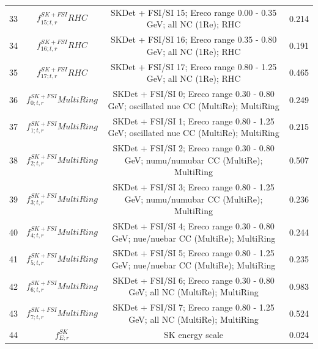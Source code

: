 \begin{tabular} { | c | c | c | c |  }
33 & $f_{15; t, r}^{SK+FSI}RHC$ & SKDet + FSI/SI 15; Ereco range 0.00 - 0.35 GeV; all NC (1Re); RHC & 0.214\\ 
34 & $f_{16; t, r}^{SK+FSI}RHC$ & SKDet + FSI/SI 16; Ereco range 0.35 - 0.80 GeV; all NC (1Re); RHC & 0.191\\ 
35 & $f_{17; t, r}^{SK+FSI}RHC$ & SKDet + FSI/SI 17; Ereco range 0.80 - 1.25 GeV; all NC (1Re); RHC & 0.465\\ 
36 & $f_{0; t, r}^{SK+FSI}MultiRing$ & SKDet + FSI/SI  0; Ereco range 0.30 - 0.80 GeV; oscillated nue CC (MultiRe); MultiRing & 0.249\\ 
37 & $f_{1; t, r}^{SK+FSI}MultiRing$ & SKDet + FSI/SI  1; Ereco range 0.80 - 1.25 GeV; oscillated nue CC (MultiRe); MultiRing & 0.215\\ 
38 & $f_{2; t, r}^{SK+FSI}MultiRing$ & SKDet + FSI/SI  2; Ereco range 0.30 - 0.80 GeV; numu/numubar CC (MultiRe); MultiRing & 0.507\\ 
39 & $f_{3; t, r}^{SK+FSI}MultiRing$ & SKDet + FSI/SI  3; Ereco range 0.80 - 1.25 GeV; numu/numubar CC (MultiRe); MultiRing & 0.236\\ 
40 & $f_{4; t, r}^{SK+FSI}MultiRing$ & SKDet + FSI/SI  4; Ereco range 0.30 - 0.80 GeV; nue/nuebar CC (MultiRe); MultiRing & 0.244\\ 
41 & $f_{5; t, r}^{SK+FSI}MultiRing$ & SKDet + FSI/SI  5; Ereco range 0.80 - 1.25 GeV; nue/nuebar CC (MultiRe); MultiRing & 0.235\\ 
42 & $f_{6; t, r}^{SK+FSI}MultiRing$ & SKDet + FSI/SI  6; Ereco range 0.30 - 0.80 GeV; all NC (MultiRe); MultiRing & 0.983\\ 
43 & $f_{7; t, r}^{SK+FSI}MultiRing$ & SKDet + FSI/SI  7; Ereco range 0.80 - 1.25 GeV; all NC (MultiRe); MultiRing & 0.524\\ 
44 & $f_{E; r}^{SK}$ & SK energy scale & 0.024\\ 

\hline

\end{tabular}